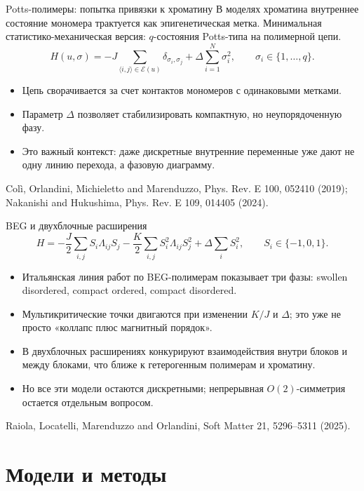 \documentclass[t,aspectratio=169]{beamer}
\newcommand{\E}{\mathcal E}
\newcommand{\source}[1]{\vfill{\tiny\raggedright #1\par}}
\begin{document}
\begin{frame}{Potts-полимеры: попытка привязки к хроматину}
  \small
  В моделях хроматина внутреннее состояние мономера трактуется как эпигенетическая метка. Минимальная статистико-механическая версия: \(q\)-состояния Potts-типа на полимерной цепи.
  \[
    H(u,\sigma)=
    -J\sum_{\langle i,j\rangle\in\E(u)}\delta_{\sigma_i,\sigma_j}
    +\Delta\sum_{i=1}^{N}\sigma_i^2,
    \qquad \sigma_i\in\{1,\ldots,q\}.
  \]
  \begin{itemize}
    \item Цепь сворачивается за счет контактов мономеров с одинаковыми метками.
    \item Параметр \(\Delta\) позволяет стабилизировать компактную, но неупорядоченную фазу.
    \item Это важный контекст: даже дискретные внутренние переменные уже дают не одну линию перехода, а фазовую диаграмму.
  \end{itemize}
  \source{Colì, Orlandini, Michieletto and Marenduzzo, Phys. Rev. E 100, 052410 (2019); Nakanishi and Hukushima, Phys. Rev. E 109, 014405 (2024).}
\end{frame}

\begin{frame}{BEG и двухблочные расширения}
  \small
  \[
    H =
    -\frac{J}{2}\sum_{i,j}S_i\Lambda_{ij}S_j
    -\frac{K}{2}\sum_{i,j}S_i^2\Lambda_{ij}S_j^2
    +\Delta\sum_i S_i^2,\qquad S_i\in\{-1,0,1\}.
  \]
  \begin{itemize}
    \item Итальянская линия работ по BEG-полимерам показывает три фазы: swollen disordered, compact ordered, compact disordered.
    \item Мультикритические точки двигаются при изменении \(K/J\) и \(\Delta\); это уже не просто «коллапс плюс магнитный порядок».
    \item В двухблочных расширениях конкурируют взаимодействия внутри блоков и между блоками, что ближе к гетерогенным полимерам и хроматину.
    \item Но все эти модели остаются дискретными; непрерывная \(O(2)\)-симметрия остается отдельным вопросом.
  \end{itemize}
  \source{Raiola, Locatelli, Marenduzzo and Orlandini, Soft Matter 21, 5296--5311 (2025).}
\end{frame}

\section{Модели и методы}
\end{document}
